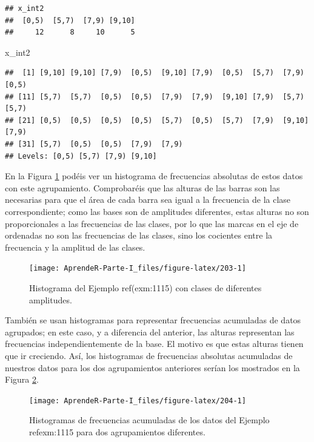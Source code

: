 \documentclass[]{book}
\newenvironment{Shaded}{\begin{snugshade}}{\end{snugshade}}
\newcommand{\NormalTok}[1]{#1}
\theoremstyle{definition}
\theoremstyle{definition}
\theoremstyle{definition}
\theoremstyle{remark}
\begin{document}
\begin{verbatim}
## x_int2
##  [0,5)  [5,7)  [7,9) [9,10] 
##     12      8     10      5
\end{verbatim}

\begin{Shaded}
\begin{Highlighting}[]
\NormalTok{x_int2}
\end{Highlighting}
\end{Shaded}

\begin{verbatim}
##  [1] [9,10] [9,10] [7,9)  [0,5)  [9,10] [7,9)  [0,5)  [5,7)  [7,9)  [0,5) 
## [11] [5,7)  [5,7)  [0,5)  [0,5)  [7,9)  [7,9)  [9,10] [7,9)  [5,7)  [5,7) 
## [21] [0,5)  [0,5)  [0,5)  [0,5)  [5,7)  [0,5)  [5,7)  [7,9)  [9,10] [7,9) 
## [31] [5,7)  [0,5)  [0,5)  [7,9)  [7,9) 
## Levels: [0,5) [5,7) [7,9) [9,10]
\end{verbatim}

En la Figura \ref{fig:203} podéis ver un histograma de frecuencias absolutas de estos datos con este agrupamiento. Comprobaréis que las alturas de las barras son las necesarias para que el área de cada barra sea igual a la frecuencia de la clase correspondiente; como las bases son de amplitudes diferentes, estas alturas no son proporcionales a las frecuencias de las clases, por lo que las marcas en el eje de ordenadas no son las frecuencias de las clases, sino los cocientes entre la frecuencia y la amplitud de las clases.

\begin{figure}

{\centering \texttt{[image: AprendeR-Parte-I\_files/figure-latex/203-1]} 

}

\caption{Histograma del Ejemplo ref(exm:1115) con clases de diferentes amplitudes.}\label{fig:203}
\end{figure}

También se usan histogramas para representar frecuencias acumuladas de datos agrupados; en este caso, y a diferencia del anterior, las alturas representan las frecuencias independientemente de la base. El motivo es que estas alturas tienen que ir creciendo. Así, los histogramas de frecuencias absolutas acumuladas de nuestros datos para los dos agrupamientos anteriores serían los mostrados en la Figura \ref{fig:204}.

\begin{figure}

{\centering \texttt{[image: AprendeR-Parte-I\_files/figure-latex/204-1]} 

}

\caption{Histogramas de frecuencias acumuladas de los datos del Ejemplo \\ref{exm:1115} para dos agrupamientos diferentes.}\label{fig:204}
\end{figure}
\end{document}
